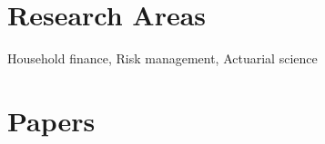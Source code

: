 \documentclass[12pt,letterpaper]{report}
\newcommand{\listitemspace}{0.15em}
\renewenvironment{itemize}
{\begin{list}{}{\setlength{\leftmargin}{0em}
            \setlength{\parskip}{0em}
            \setlength{\itemsep}{\listitemspace}
            \setlength{\parsep}{\listitemspace}}}
    {\end{list}}
\begin{document}
%
%
%
%
%



    \section*{Research Areas}

    \begin{itemize}

        \item Household finance, Risk management, Actuarial science

%

    \end{itemize}



    \section*{Papers}
\end{document}

